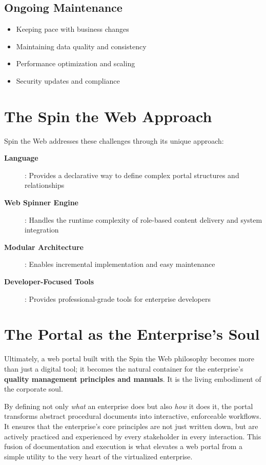 \subsection{Ongoing Maintenance}

\begin{itemize}
	\item Keeping pace with business changes
	\item Maintaining data quality and consistency
	\item Performance optimization and scaling
	\item Security updates and compliance
\end{itemize}

\section{The Spin the Web Approach}
\label{sec:spin-approach}

Spin the Web addresses these challenges through its unique approach:

\begin{description}
\item[\textbf{\wbol{} Language}]: Provides a declarative way to define complex portal structures and relationships
\item[\textbf{Web Spinner Engine}]: Handles the runtime complexity of role-based content delivery and system integration
\item[\textbf{Modular Architecture}]: Enables incremental implementation and easy maintenance
\item[\textbf{Developer-Focused Tools}]: Provides professional-grade tools for enterprise developers
\end{description}

\section{The Portal as the Enterprise's Soul}
\label{sec:portal-soul}

Ultimately, a web portal built with the Spin the Web philosophy becomes more than just a digital tool; it becomes the natural container for the enterprise's \textbf{quality management principles and manuals}. It is the living embodiment of the corporate soul.

By defining not only \textit{what} an enterprise does but also \textit{how} it does it, the portal transforms abstract procedural documents into interactive, enforceable workflows. It ensures that the enterprise's core principles are not just written down, but are actively practiced and experienced by every stakeholder in every interaction. This fusion of documentation and execution is what elevates a web portal from a simple utility to the very heart of the virtualized enterprise.
